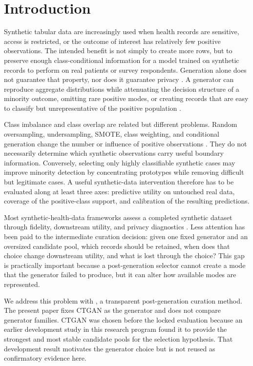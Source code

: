 \section{Introduction}
\label{sec:introduction}

Synthetic tabular data are increasingly used when health records are sensitive, access is restricted, or the outcome of interest has relatively few positive observations. The intended benefit is not simply to create more rows, but to preserve enough class-conditional information for a model trained on synthetic records to perform on real patients or survey respondents. Generation alone does not guarantee that property, nor does it guarantee privacy \citep{goncalves2020,hernandez2023,kaabachi2025}. A generator can reproduce aggregate distributions while attenuating the decision structure of a minority outcome, omitting rare positive modes, or creating records that are easy to classify but unrepresentative of the positive population \citep{ghosheh2024,pezoulas2024}.

Class imbalance and class overlap are related but different problems. Random oversampling, undersampling, SMOTE, class weighting, and conditional generation change the number or influence of positive observations \citep{chawla2002,he2009}. They do not necessarily determine which synthetic observations carry useful boundary information. Conversely, selecting only highly classifiable synthetic cases may improve minority detection by concentrating prototypes while removing difficult but legitimate cases. A useful synthetic-data intervention therefore has to be evaluated along at least three axes: predictive utility on untouched real data, coverage of the positive-class support, and calibration of the resulting predictions.

Most synthetic-health-data frameworks assess a completed synthetic dataset through fidelity, downstream utility, and privacy diagnostics \citep{goncalves2020,hernandez2023,hernandez2025}. Less attention has been paid to the intermediate curation decision: given one fixed generator and an oversized candidate pool, which records should be retained, when does that choice change downstream utility, and what is lost through the choice? This gap is practically important because a post-generation selector cannot create a mode that the generator failed to produce, but it can alter how available modes are represented.

We address this problem with \sepa{}, a transparent post-generation curation method. The present paper fixes CTGAN \citep{xu2019} as the generator and does not compare generator families. CTGAN was chosen before the locked evaluation because an earlier development study in this research program found it to provide the strongest and most stable candidate pools for the selection hypothesis. That development result motivates the generator choice but is not reused as confirmatory evidence here.

